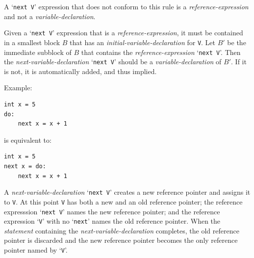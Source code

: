 \documentclass[12pt]{article}
\newenvironment{indpar}[1][0.3in]%
	{\begin{list}{}%
		     {\setlength{\itemsep}{0in}%
		      \setlength{\topsep}{0in}%
		      \setlength{\parsep}{1ex}%
		      \setlength{\labelwidth}{#1}%
		      \setlength{\leftmargin}{#1}%
		      \addtolength{\leftmargin}{\labelsep}}%
	 \item}%
	{\end{list}}
\begin{document}
\begin{indpar}
\begin{enumerate}
A `{\tt next V}' expression that does not conform to this rule is
a {\em reference-expression} and not a {\em variable-declaration}.

\item Given a `{\tt next V}' expression that is a {\em reference-expression},
it must be contained in a smallest block $B$ that has an
{\em initial-variable-declaration} for {\tt V}.  Let $B'$ be the immediate
subblock of $B$ that contains the {\em reference-expression} `{\tt next V}'.
Then the {\em next-variable-declaration} `{\tt next V}' should be a
{\em variable-declaration} of $B'$.  If it is not, it is automatically
added, and thus implied.\label{BLOCK-NEXT-PROMOTION}

Example:
\begin{indpar}\begin{verbatim}
int x = 5
do:
    next x = x + 1
\end{verbatim}\end{indpar}
is equivalent to:
\begin{indpar}\begin{verbatim}
int x = 5
next x = do:
    next x = x + 1
\end{verbatim}\end{indpar}
\item \label{NEXT-REFERENCE-POINTER}
A {\em next-variable-declaration} `{\tt next V}'
creates a new reference pointer and assigns it to {\tt V}.
At this point {\tt V} has both a new and an old reference pointer;
the reference expresssion `{\tt next V}' names the new reference pointer;
and the reference expression `{\tt V}' with no `{\tt next}' names the
old reference pointer.  When the {\em statement} containing the
{\em next-variable-declaration} completes, the old reference pointer
is discarded and the new reference pointer becomes the only reference
pointer named by `{\tt V}'.


\end{enumerate}
\end{indpar}
\end{document}

